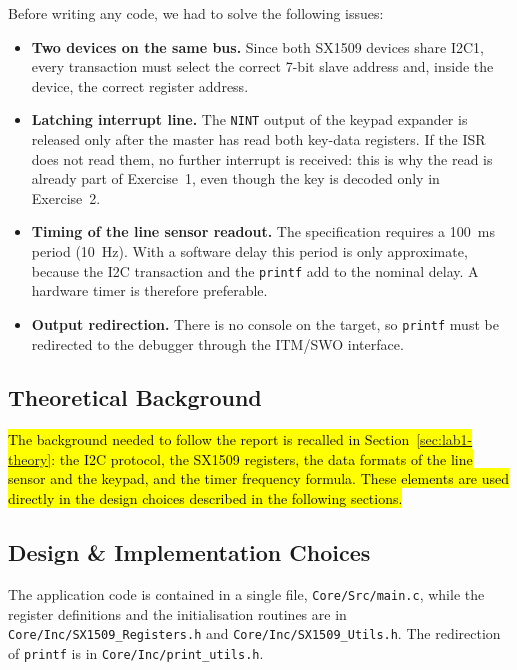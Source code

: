 \documentclass[english]{article}
\begin{document}
Before writing any code, we had to solve the following issues:

\begin{itemize}[nosep]
  \item \textbf{Two devices on the same bus.} Since both SX1509 devices share I2C1,
        every transaction must select the correct 7-bit slave address and,
        inside the device, the correct register address.
  \item \textbf{Latching interrupt line.} The \texttt{NINT} output of the
        keypad expander is released only after the master has read both key-data
        registers. If the ISR does not read them, no further interrupt is received:
        this is why the read is already part of Exercise~1, even though the key is
        decoded only in Exercise~2.
  \item \textbf{Timing of the line sensor readout.} The specification requires a
        100~ms period (10~Hz). With a software delay this period is only
        approximate, because the I2C transaction and the \texttt{printf} add to
        the nominal delay. A hardware timer is therefore preferable.
  \item \textbf{Output redirection.} There is no console on the target, so
        \texttt{printf} must be redirected to the debugger through the ITM/SWO
        interface.
\end{itemize}

\subsection{Theoretical Background}

\noindent \hl{The background needed to follow the report is recalled in Section~\mbox{\ref{sec:lab1-theory}}:
  the I2C protocol, the SX1509 registers, the data formats of the line sensor and the keypad, and the timer
  frequency formula. These elements are used directly in the design choices described in the following sections.}

\subsection{Design \& Implementation Choices}
\label{sec:lab1-code}

The application code is contained in a single file, \texttt{Core/Src/main.c}, while the register definitions
and the initialisation routines are in \texttt{Core/Inc/SX1509\_Registers.h} and
\texttt{Core/Inc/SX1509\_Utils.h}. The redirection of \texttt{printf} is in \texttt{Core/Inc/print\_utils.h}.
\end{document}
